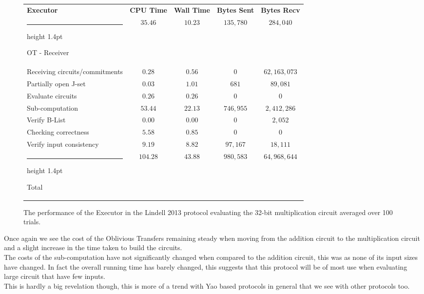 \documentclass[11pt]{article} %
\makeatletter
\newcommand{\thickhline}{%
    \noalign {\ifnum 0=`}\fi \hrule height 1.4pt
    \futurelet \reserved@a \@xhline
}
\makeatother
\begin{document}
				\begin{figure}[!ht]
					\begin{tabular}{| p{4.3cm} | c c c c |}
						\hline
						\textbf{Executor} & \textbf{CPU Time} & \textbf{Wall Time} & \textbf{Bytes Sent} & \textbf{Bytes Recv} \\
						\thickhline
						OT - Receiver & $35.46$ & $10.23$ & $135,780$ & $284,040$ \\
						\hline
						Receiving circuits/commitments & $0.28$ & $0.56$ & $0$ & $62,163,073$ \\
						\hline
						Partially open J-set & $0.03$ & $1.01$ & $681$ & $89,081$ \\
						\hline
						Evaluate circuits & $0.26$ & $0.26$ & $0$ & $0$ \\
						\hline
						Sub-computation & $53.44$ & $22.13$ & $746,955$ & $2,412,286$ \\
						\hline
						Verify B-List & $0.00$ & $0.00$ & $0$ & $2,052$ \\
						\hline
						Checking correctness & $5.58$ & $0.85$ & $0$ & $0$ \\
						\hline
						Verify input consistency & $9.19$ & $8.82$ & $97,167$ & $18,111$ \\
						\thickhline
						Total & $104.28$ & $43.88$ & $980,583$ & $64,968,644$ \\
						\hline
					\end{tabular}
					\caption{The performance of the Executor in the Lindell 2013 protocol evaluating the 32-bit multiplication circuit averaged over 100 trials.\label{table:L_2013_Mul_Executor} }
				\end{figure}
				\FloatBarrier

				Once again we see the cost of the Oblivious Transfers remaining steady when moving from the addition circuit to the multiplication circuit and a slight increase in the time taken to build the circuits. \\

				The costs of the sub-computation have not significantly changed when compared to the addition circuit, this was  as none of its input sizes have changed. In fact the overall running time has barely changed, this suggests that this protocol will be of most use when evaluating large circuit that have few inputs.\\

				This is hardly a big revelation though, this is more of a trend with Yao based protocols in general that we see with other protocols too.\\
\end{document}
